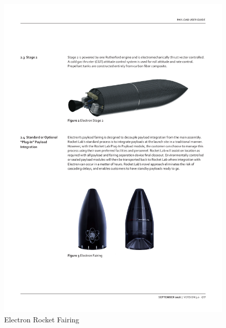 \newpage
\begin{figure}[h]
\centering 
\includegraphics[scale=0.7]{./Sections_CD/S2-Launcher/Images_S2/Picture_3_S2.pdf} 
\caption{Electron Rocket Fairing}
\end{figure}


